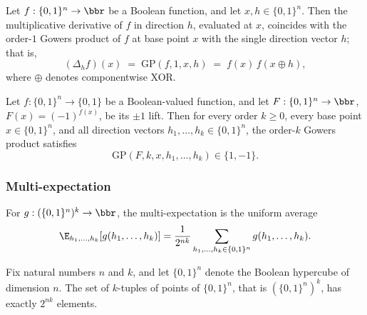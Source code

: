 \begin{lemma}
\label{LowDegreeTest.mult_deriv_eq_gowers_one}
\leanok
{}
Let $f : \{0,1\}^n \to \bbr$ be a Boolean function, and let $x, h \in \{0,1\}^n$. Then
the multiplicative derivative of $f$ in direction $h$, evaluated at $x$, coincides with
the order-$1$ Gowers product of $f$ at base point $x$ with the single direction vector
$h$; that is,
\[
  (\Delta_h f)(x) \;=\; \mathrm{GP}(f, 1, x, h) \;=\; f(x)\, f(x \oplus h),
\]
where $\oplus$ denotes componentwise XOR.
\end{lemma}

\begin{lemma}
\label{LowDegreeTest.gowers_product_pm1}
\leanok
{}
Let $f : \{0,1\}^n \to \{0,1\}$ be a Boolean-valued function, and let $F : \{0,1\}^n \to
\bbr$, $F(x) = (-1)^{f(x)}$, be its $\pm1$ lift. Then for every order $k \ge 0$, every
base point $x \in \{0,1\}^n$, and all direction vectors $h_1, \ldots, h_k \in
\{0,1\}^n$, the order-$k$ Gowers product satisfies
\[
  \mathrm{GP}(F, k, x, h_1, \ldots, h_k) \in \{1, -1\}.
\]
\end{lemma}

\subsubsection{Multi-expectation}

\begin{definition}
\label{LowDegreeTest.multi_expectation}
\leanok
{}
For $g : (\{0,1\}^n)^k \to \bbr$, the multi-expectation is the uniform average
\[
  \E_{h_1,\ldots,h_k}[g(h_1,\ldots,h_k)]
  = \frac{1}{2^{nk}} \sum_{h_1,\ldots,h_k \in \{0,1\}^n} g(h_1,\ldots,h_k).
\]
\end{definition}

\begin{lemma}
\label{LowDegreeTest.card_multi_hypercube}
\leanok
{}
Fix natural numbers $n$ and $k$, and let $\{0,1\}^n$ denote the Boolean hypercube of
dimension $n$. The set of $k$-tuples of points of $\{0,1\}^n$, that is
$\left(\{0,1\}^n\right)^k$, has exactly $2^{nk}$ elements.
\end{lemma}

